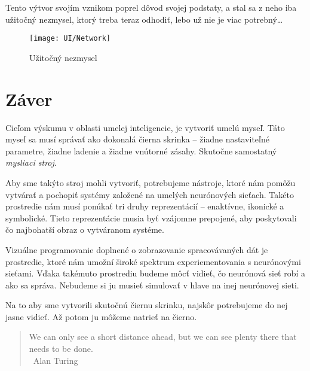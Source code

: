 Tento výtvor svojím vznikom poprel dôvod svojej podstaty, a stal sa z neho iba užitočný nezmysel, ktorý treba teraz odhodiť, lebo už nie je viac potrebný\dots

\begin{sidewaysfigure}[ht]
  \centering
  \texttt{[image: UI/Network]}
  \caption{Užitočný nezmysel}
\end{sidewaysfigure}


\chapter*{Záver}

Cieľom výskumu v oblasti umelej inteligencie, je vytvoriť umelú myseľ. Táto myseľ sa musí správať ako dokonalá čierna skrinka -- žiadne nastaviteľné parametre, žiadne ladenie a žiadne vnútorné zásahy. Skutočne samostatný \emph{mysliaci stroj}.

Aby sme takýto stroj mohli vytvoriť, potrebujeme nástroje, ktoré nám pomôžu vytvárať a pochopiť systémy založené na umelých neurónových sieťach. Takéto prostredie nám musí ponúkať tri druhy reprezentácií -- enaktívne, ikonické a symbolické. Tieto reprezentácie musia byť vzájomne prepojené, aby poskytovali čo najbohatší obraz o vytváranom systéme.

Vizuálne programovanie doplnené o zobrazovanie spracovávaných dát je prostredie, ktoré nám umožní široké spektrum experiementovania s neurónovými sieťami. Vďaka takémuto prostrediu budeme môcť vidieť, čo neurónová sieť robí a ako sa správa. Nebudeme si ju musieť simulovať v hlave na inej neurónovej sieti.
 
Na to aby sme vytvorili skutočnú čiernu skrinku, najskôr potrebujeme do nej jasne vidieť. Až potom ju môžeme natrieť na čierno.

\vfill

\begin{quote}
  \Large
We can only see a short distance ahead, but we can see plenty there that needs to be done.\\
\mbox{}~\hfill \large Alan Turing
\end{quote}

\vfill